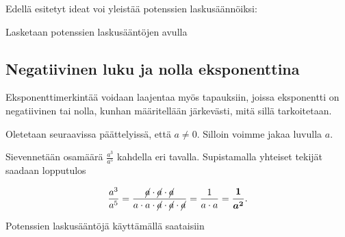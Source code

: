  Edellä esitetyt ideat voi yleistää potenssien laskusäännöiksi:
    
 
    \begin{esimerkki}
        Lasketaan potenssien laskusääntöjen avulla
    \end{esimerkki} 
 
\subsection*{Negatiivinen luku ja nolla eksponenttina}

Eksponenttimerkintää voidaan laajentaa myös tapauksiin, joissa eksponentti on negatiivinen tai nolla, kunhan määritellään järkevästi, mitä sillä tarkoitetaan.

Oletetaan seuraavissa päättelyissä, että $a \neq 0$. Silloin voimme jakaa luvulla $a$.
    
Sievennetään osamäärä $\frac{a^3}{a^5}$ kahdella eri tavalla. Supistamalla yhteiset tekijät saadaan lopputulos
    
    \begin{equation*}
        \frac{a^3}{a^5} =
        \frac{\cancel{a}\cdot \cancel{a}\cdot \cancel{a}}{a\cdot a\cdot
        \cancel{a}\cdot \cancel{a}\cdot \cancel{a}} = 
        \frac{1}{a\cdot a}=\boldsymbol{\frac{1}{a^2}}.
    \end{equation*}
    
Potenssien laskusääntöjä käyttämällä saataisiin
    
